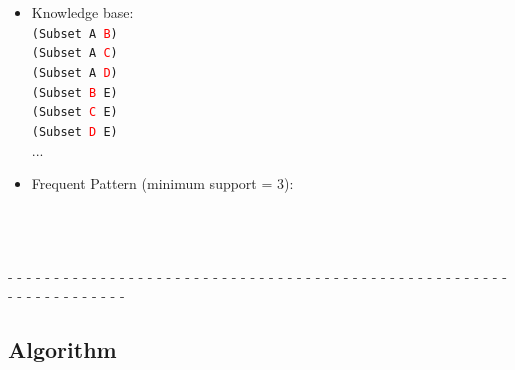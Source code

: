 \documentclass[aspectratio=169]{beamer}
\begin{document}
\begin{frame}

  {\small
    \begin{itemize}
    \item Knowledge base:\\
      \texttt{(Subset A \textcolor<2,4>{red}{B})}\\
      \texttt{(Subset A \textcolor<2,4>{red}{C})}\\
      \texttt{(Subset A \textcolor<2,4>{red}{D})}\\
      \texttt{(Subset \textcolor<3->{red}{B} E)}\\
      \texttt{(Subset \textcolor<3->{red}{C} E)}\\
      \texttt{(Subset \textcolor<3->{red}{D} E)}\\
      ...\\

    \item Frequent Pattern (minimum support = 3):\\
      \\
      \\
      \\
    \end{itemize}
  }

  - - - - - - - - - - - - - - - - - - - - - - - - - - - - - - - - - -
  - - - - - - - - - - - - - - - - - - - - - - - - - - - - - - - - -\\[0.1cm]

\end{frame}

\subsection{Algorithm}
\end{document}
